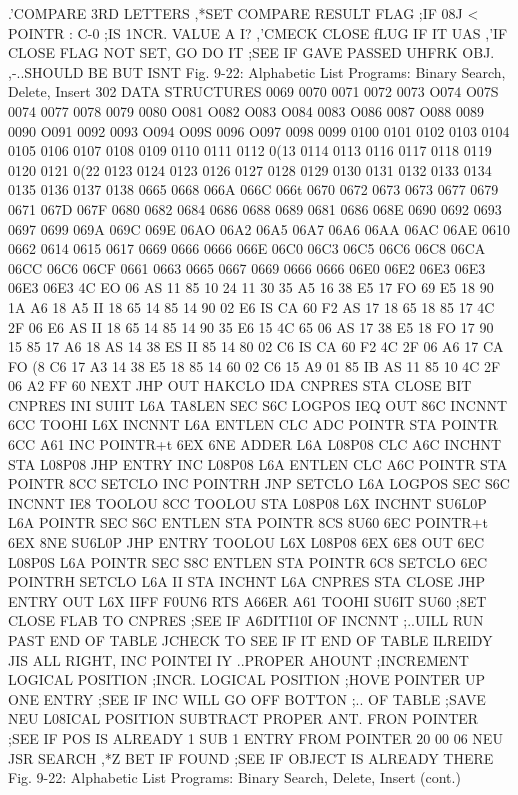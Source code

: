 {{{{{{{{{.'COMPARE 3RD LETTERS
,*SET COMPARE RESULT FLAG
;IF 08J < POINTR : C-0
;IS 1NCR. VALUE A I?
,'CMECK CLOSE fLUG IF IT UAS
,'IF CLOSE FLAG NOT SET, GO DO IT
;SEE IF GAVE PASSED UHFRK OBJ.
,-..SHOULD BE BUT ISNT
Fig. 9-22: Alphabetic List Programs: Binary Search, Delete, Insert
302
DATA STRUCTURES
0069
0070
0071
0072
0073
O074
O07S
0074
0077
0078
0079
0080
O081
O082
O083
O084
0083
O086
0087
O088
0089
0090
O091
0092
0093
O094
O09S
0096
O097
0098
0099
0100
0101
0102
0103
0104
0105
0106
0107
0108
0109
0110
0111
0112
0(13
0114
0113
0116
0117
0118
0119
0120
0121
0(22
0123
0124
0123
0126
0127
0128
0129
0130
0131
0132
0133
0134
0135
0136
0137
0138
0665
0668
066A
066C
066t
0670
0672
0673
0673
0677
0679
0671
067D
067F
0680
0682
0684
0686
0688
0689
0681
0686
068E
0690
0692
0693
0697
0699
069A
069C
069E
06AO
06A2
06A5
06A7
06A6
06AA
06AC
06AE
0610
0662
0614
0615
0617
0669
0666
0666
066E
06C0
06C3
06C5
06C6
06C8
06CA
06CC
06C6
06CF
0661
0663
0665
0667
0669
0666
0666
06E0
06E2
06E3
06E3
06E3
06E3
4C EO 06
AS 11
85 10
24 11
30 35
A5 16
38
E5 17
FO 69
E5 18
90 1A
A6 18
A5 II
18
65 14
85 14
90 02
E6 IS
CA
60 F2
AS 17
18
65 18
85 17
4C 2F 06
E6 \7
AS II
18
65 14
85 14
90 35
E6 15
4C 65 06
AS 17
38
E5 18
FO 17
90 15
85 17
A6 18
AS 14
38
ES II
85 14
80 02
C6 IS
CA
60 F2
4C 2F 06
A6 17
CA
FO (8
C6 17
A3 14
38
E5 18
85 14
60 02
C6 15
A9 01
85 IB
AS 11
85 10
4C 2F 06
A2 FF
60
NEXT
JHP OUT
HAKCLO IDA CNPRES
STA CLOSE
BIT CNPRES
INI SUIIT
L6A TA8LEN
SEC
S6C LOGPOS
IEQ OUT
86C INCNNT
6CC TOOHI
L6X INCNNT
L6A ENTLEN
CLC
ADC POINTR
STA POINTR
6CC A61
INC POINTR+t
6EX
6NE ADDER
L6A L08P08
CLC
A6C INCHNT
STA L08P08
JHP ENTRY
INC L08P08
L6A ENTLEN
CLC
A6C POINTR
STA POINTR
8CC SETCLO
INC POINTRH
JNP SETCLO
L6A LOGPOS
SEC
S6C INCNNT
IE8 TOOLOU
8CC TOOLOU
STA L08P08
L6X INCHNT
SU6L0P L6A POINTR
SEC
S6C ENTLEN
STA POINTR
8CS 8U60
6EC POINTR+t
6EX
8NE SU6L0P
JHP ENTRY
TOOLOU L6X L08P08
6EX
6E8 OUT
6EC L08P0S
L6A POINTR
SEC
S8C ENTLEN
STA POINTR
6C8 SETCLO
6EC POINTRH
SETCLO L6A II
STA INCHNT
L6A CNPRES
STA CLOSE
JHP ENTRY
OUT L6X IIFF
F0UN6 RTS
A66ER
A61
TOOHI
SU6IT
SU60
;8ET CLOSE FLAB TO CNPRES
;SEE IF A6DITI10I OF INCNNT
;..UILL RUN PAST END OF TABLE
JCHECK TO SEE IF IT END OF TABLE ILREIDY
JIS ALL RIGHT, INC POINTEI IY
{..PROPER AHOUNT
;INCREMENT LOGICAL POSITION
;INCR. LOGICAL POSITION
;HOVE POINTER UP ONE ENTRY
;SEE IF INC WILL GO OFF BOTTON
;.. OF TABLE
;SAVE NEU L08ICAL POSITION
{SUBTRACT PROPER ANT. FRON POINTER
;SEE IF POS IS ALREADY 1
}SUB 1 ENTRY FROM POINTER
20 00 06 NEU JSR SEARCH
,*Z BET IF FOUND
;SEE IF OBJECT IS ALREADY THERE
Fig. 9-22: Alphabetic List Programs: Binary Search, Delete, Insert (cont.)
}}}}}}}}}}
